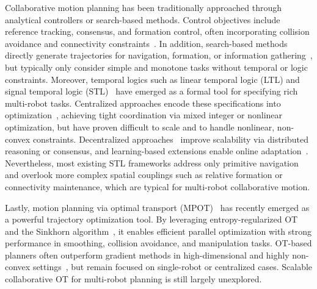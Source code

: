 Collaborative motion planning has been traditionally approached through
analytical controllers or search-based methods.
Control objectives include reference tracking,
consensus, and formation control,
often incorporating collision avoidance and connectivity
constraints~\cite{olfati2007consensus, alonso2017multi,
herguedas2022multi,sabattini2013distributed}.
In addition, search-based methods
directly generate trajectories for navigation, formation, or information
gathering~\cite{honig2019persistent,sharon2015conflict}, but typically only
consider simple and monotone tasks without temporal or logic constraints.
Moreover, temporal logics such as linear temporal logic (LTL) and signal temporal logic
(STL)~\cite{guo2015multi, lindemann2025formal, leahy2021scalable,lindemann2019coupled}
have emerged as a formal tool for specifying rich multi-robot tasks.
Centralized approaches encode these specifications
into optimization~\cite{fainekos2009temporal,liu2022stlq,kurtz2022mixed},
achieving tight coordination via mixed integer or nonlinear optimization,
but have proven difficult to scale and to handle nonlinear, non-convex constraints.
Decentralized approaches~\cite{chen2021decentralized, lindemann2025formal, leung2020distributed}
improve scalability via distributed reasoning or consensus, and learning-based
extensions enable online adaptation~\cite{aksaray2022online}. Nevertheless, most
existing STL frameworks address only primitive navigation and overlook
more complex spatial couplings such as relative formation or connectivity maintenance,
which are typical for multi-robot collaborative motion.

Lastly, motion planning via optimal transport (MPOT)~\cite{le2023accelerating} has recently emerged
as a powerful trajectory optimization tool.
By leveraging entropy-regularized OT and the Sinkhorn algorithm~\cite{cuturi2013sinkhorn},
it enables efficient parallel optimization with strong performance in smoothing,
collision avoidance, and manipulation tasks.
OT-based planners often outperform gradient methods in high-dimensional and highly non-convex
settings~\cite{ratliff2009learning,chen2020optimal,le2023hierarchical}, but remain
focused on single-robot or centralized cases. Scalable collaborative OT
for multi-robot planning is still largely unexplored.



